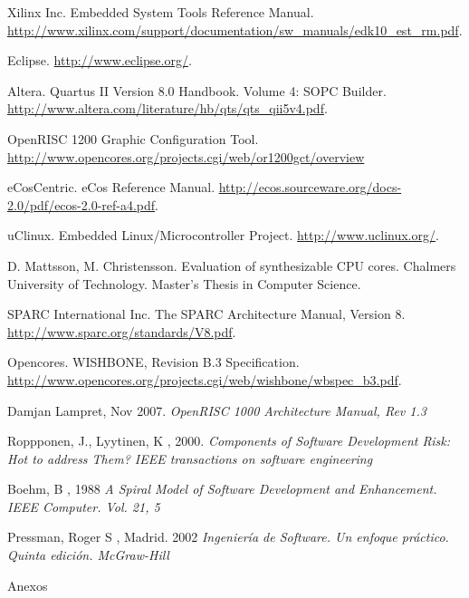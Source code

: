 \documentclass[a4paper,12pt]{report}
\begin{document}
\begin{thebibliography}{99}
Xilinx Inc. Embedded System Tools Reference Manual.  \url{http://www.xilinx.com/support/documentation/sw_manuals/edk10_est_rm.pdf}.

Eclipse. 
\url{http://www.eclipse.org/}.

Altera. Quartus II Version 8.0 Handbook. Volume 4: SOPC Builder. 
\url{http://www.altera.com/literature/hb/qts/qts_qii5v4.pdf}.

OpenRISC 1200 Graphic Configuration Tool. \url{http://www.opencores.org/projects.cgi/web/or1200gct/overview}

 eCosCentric. eCos Reference Manual. \url{http://ecos.sourceware.org/docs-2.0/pdf/ecos-2.0-ref-a4.pdf}.

 uClinux. Embedded Linux/Microcontroller Project. \url{http://www.uclinux.org/}.

 D. Mattsson, M. Christensson. Evaluation of synthesizable CPU cores. Chalmers University of Technology. Master's Thesis in Computer Science.

 SPARC International Inc. The SPARC Architecture Manual, Version 8. 
\url{http://www.sparc.org/standards/V8.pdf}.

 Opencores. WISHBONE, Revision B.3 Specification.  \url{http://www.opencores.org/projects.cgi/web/wishbone/wbspec_b3.pdf}.


 Damjan Lampret, Nov 2007.
  \textit{OpenRISC 1000 Architecture Manual, Rev 1.3}

 Roppponen, J., Lyytinen, K , 2000. 
\textit{Components of Software Development Risk: Hot to address Them? IEEE transactions on software
engineering}

 Boehm, B , 1988  
\textit{A Spiral Model of Software Development and Enhancement. IEEE Computer. Vol. 21, 5} 

 Pressman, Roger S , Madrid. 2002
\textit{Ingeniería de Software. Un enfoque práctico. Quinta edición. McGraw-Hill} 


\end{thebibliography}

\appendix
\begin{part}{Anexos}
\newpage

\newpage
\end{part}
\end{document}
